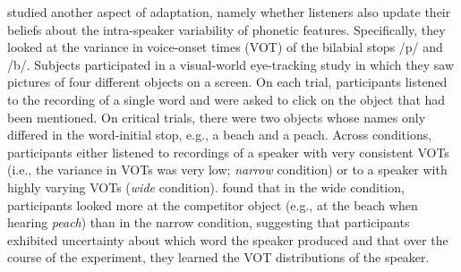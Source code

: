  \cite{Clayards2008} studied another aspect of adaptation, namely whether listeners also update their beliefs about the intra-speaker variability
 of phonetic features. Specifically, they looked at the variance in voice-onset times (VOT) of the bilabial stops /p/ and /b/. Subjects participated in a visual-world
 eye-tracking study in which they saw pictures of four different objects on a screen. On each trial, participants listened to the recording of a single word
 and were asked to click on the object that had been mentioned. On critical trials, there were two objects whose names only differed in the word-initial stop, e.g.,
 a beach and a peach. Across conditions, participants either listened to recordings of a speaker with very consistent VOTs (i.e., the variance in VOTs was very low; \textit{narrow} condition) or
 to a speaker with highly varying VOTs (\textit{wide} condition). \cite{Clayards2008} found that in the wide condition, participants looked more at the competitor object 
 (e.g., at the beach when hearing \textit{peach}) than in the narrow condition, suggesting that participants exhibited uncertainty about which word the speaker produced
and that over the course of the experiment, they learned the VOT distributions of the speaker.


